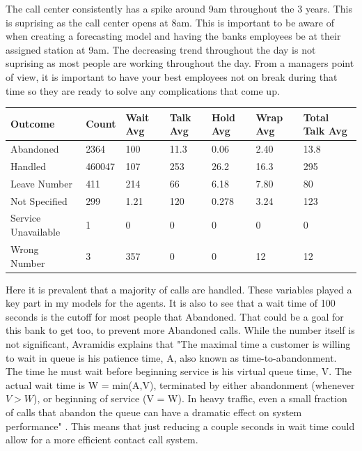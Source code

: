 \documentclass[12pt]{article}
\begin{document}
The call center consistently has a spike around 9am throughout the 3 years. This is suprising as the call center opens at 8am. This is important to be aware of when
creating a forecasting model and having the banks employees be at their assigned station at 9am. The decreasing trend throughout the day is not suprising
as most people are working throughout the day. From a managers point of view, it is important to have your best employees not on break during that time so they are ready to solve 
any complications that come up. \citep{rafaeli2008impact}
\begin{table}[H]
  \resizebox{\textwidth}{!} {
  \begin{tabular}{ l | l | l | l | l | l | l}
    {\bf Outcome} & {\bf Count} & {\bf Wait Avg} & {\bf Talk Avg} & {\bf Hold Avg} & {\bf Wrap Avg} & {\bf Total Talk Avg} \\
  \hline
  Abandoned & 2364 & 100 & 11.3 & 0.06 & 2.40 & 13.8 \\
  \hline
  Handled & 460047 & 107 & 253 & 26.2 & 16.3 & 295\\
  \hline
  Leave Number & 411 & 214 & 66 & 6.18 & 7.80 & 80\\
  \hline
  Not Specified & 299 & 1.21 & 120 & 0.278 & 3.24 & 123\\
  \hline
  Service Unavailable & 1 & 0 & 0 & 0 & 0 & 0\\
  \hline
  Wrong Number & 3 & 357 & 0 & 0 & 12 & 12\\
  \end{tabular}
  }
  \end{table}
Here it is prevalent that a majority of calls are handled. These variables played a key part in my models for the agents. It is also to see that 
a wait time of 100 seconds is the cutoff for most people that Abandoned. That could be a goal for this bank to get too, to prevent more Abandoned calls. While 
the number itself is not significant, Avramidis explains that "The maximal time a customer is willing to wait in queue is his patience time, A, also known as time-to-abandonment. The
time he must wait before beginning service is his virtual queue time, V. The actual wait time is W = min(A,V), terminated by either abandonment (whenever $V  >  W$), or beginning of service (V = W).
In heavy traffic, even a small fraction of calls that abandon the queue can have a dramatic effect on system performance" \citep{avramidis2005modeling}. This means that just reducing a couple seconds
in wait time could allow for a more efficient contact call system.
\end{document}
